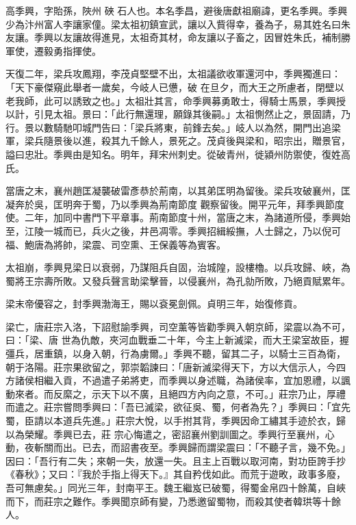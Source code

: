 
\begin{pinyinscope}

 高季興，字貽孫，陜州
 硤
 石人也。本名季昌，避後唐獻祖廟諱，更名季興。季興少為汴州富人李讓家僮。梁太祖初鎮宣武，讓以入貲得幸，養為子，易其姓名曰朱友讓。季興以友讓故得進見，太祖奇其材，命友讓以子畜之，因冒姓朱氏，補制勝軍使，遷毅勇指揮使。



 天復二年，梁兵攻鳳翔，李茂貞堅壁不出，太祖議欲收軍還河中，季興獨進曰：「天下豪傑窺此舉者一歲矣，今岐人已憊，破
 在旦夕，而大王之所慮者，閉壁以老我師，此可以誘致之也。」太祖壯其言，命季興募勇敢士，得騎士馬景，季興授以計，引見太祖。景曰：「此行無還理，願錄其後嗣。」太祖惻然止之，景固請，乃行。景以數騎馳叩城門告曰：「梁兵將東，前鋒去矣。」岐人以為然，開門出追梁軍，梁兵隨景後以進，殺其九千餘人，景死之。茂貞後與梁和，昭宗出，贈景官，謚曰忠壯。季興由是知名。明年，拜宋州刺史。從破青州，徙潁州防禦使，復姓高氏。



 當唐之末，襄州趙匡凝襲破雷彥恭於荊南，以其弟匡明為留後。梁兵攻破襄州，匡凝奔於吳，匡明奔于蜀，乃以季興為荊南節度
 觀察留後。開平元年，拜季興節度使。二年，加同中書門下平章事。荊南節度十州，當唐之末，為諸道所侵，季興始至，江陵一城而已，兵火之後，井邑凋零。季興招緝綏撫，人士歸之，乃以倪可福、鮑唐為將帥，梁震、司空熏、王保義等為賓客。



 太祖崩，季興見梁日以衰弱，乃謀阻兵自固，治城隍，設樓櫓。以兵攻歸、峽，為蜀將王宗壽所敗。又發兵聲言助梁擊晉，以侵襄州，為孔勍所敗，乃絕貢賦累年。



 梁末帝優容之，封季興渤海王，賜以袞冕劍佩。貞明三年，始復修貢。



 梁亡，唐莊宗入洛，下詔慰諭季興，司空薰等皆勸季興入朝京師，梁震以為不可，曰：「梁、唐
 世為仇敵，夾河血戰垂二十年，今主上新滅梁，而大王梁室故臣，握彊兵，居重鎮，以身入朝，行為虜爾。」季興不聽，留其二子，以騎士三百為衛，朝于洛陽。莊宗果欲留之，郭崇韜諫曰：「唐新滅梁得天下，方以大信示人，今四方諸侯相繼入貢，不過遣子弟將吏，而季興以身述職，為諸侯率，宜加恩禮，以諷動來者。而反縻之，示天下以不廣，且絕四方內向之意，不可。」莊宗乃止，厚禮而遣之。莊宗嘗問季興曰：「吾已滅梁，欲征吳、蜀，何者為先？」季興曰：「宜先蜀，臣請以本道兵先進。」莊宗大悅，以手拊其背，季興因命工繡其手迹於衣，歸以為榮耀。季興已去，莊
 宗心悔遣之，密詔襄州劉訓圖之。季興行至襄州，心動，夜斬關而出。已去，而詔書夜至。季興歸而謂梁震曰：「不聽子言，幾不免。」因曰：「吾行有二失；來朝一失，放還一失。且主上百戰以取河南，對功臣誇手抄《春秋》；又曰：『我於手指上得天下。』其自矜伐如此。而荒于遊畋，政事多廢，吾可無慮矣。」同光三年，封南平王。魏王繼岌已破蜀，得蜀金帛四十餘萬，自峽而下，而莊宗之難作。季興聞京師有變，乃悉邀留蜀物，而殺其使者韓珙等十餘人。




\end{pinyinscope}
